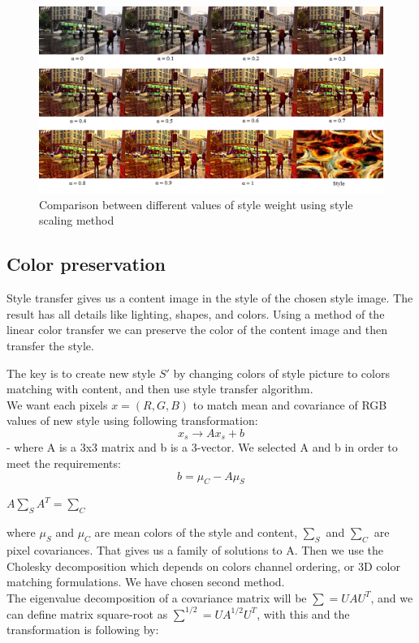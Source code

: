\documentclass[../Main.tex]{subfiles}
\begin{document}
\begin{figure}[h!]
    \centering
    \includegraphics[scale=0.75]{Images/style1.png}
    \caption{Comparison between different values of style weight using style scaling method}
    \label{fig:style1}
\end{figure}

\subsection{Color preservation}
Style transfer gives us a content image in the style of the chosen style image. The result has all details like lighting, shapes, and colors. Using a method of the linear color transfer we can preserve the color of the content image and then transfer the style.

The key is to create new style $S'$ by changing colors of style picture to colors matching with content, and then use style transfer algorithm. \\
We want each pixels $x=(R,G,B)$ to match mean and covariance of RGB values of new style using following transformation: $$x_s\rightarrow{}Ax_s+b$$ - where A is a 3x3 matrix and b is a 3-vector. We selected A and b in order to meet the requirements:
 $$b=\mu_C - A\mu_S$$ 
\begin{center}
    $A\sum_SA^T = \sum_C$
\end{center}
where $\mu_S$ and $\mu_C$ are mean colors of the style and content, $\sum_S$ and $\sum_C$ are pixel covariances. That gives us a family of solutions to A. Then we use the Cholesky decomposition which depends on colors channel ordering, or 3D color matching formulations. We have chosen second method. \\
The eigenvalue decomposition of a covariance matrix will be $\sum=UAU^T$, and we can define matrix square-root as $\sum^{1/2}=UA^{1/2}U^T$, with this and the transformation is following by:
\end{document}
